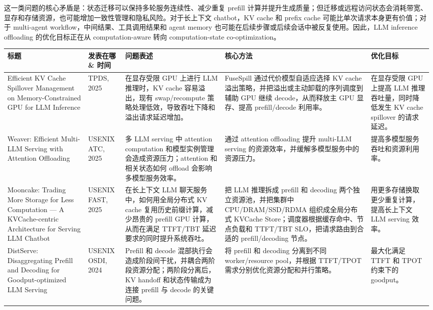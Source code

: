 \documentclass[a4paper,10pt]{ctexart}
\begin{document}
这一类问题的核心矛盾是：状态迁移可以保持多轮服务连续性、减少重复 prefill 计算并提升生成质量；但迁移或远程访问状态会消耗带宽、显存和存储资源，也可能增加一致性管理和隐私风险。对于长上下文 chatbot，KV cache 和 prefix cache 可能比单次请求本身更有价值；对于 multi-agent workflow，中间结果、工具调用结果和 agent memory 也可能在后续步骤或后续会话中被反复使用。因此，LLM inference offloading 的优化目标正在从 computation-aware 转向 computation-state co-optimization。


\begin{table}[H]
\centering
\scriptsize
\setlength{\tabcolsep}{3pt}
\renewcommand{\arraystretch}{1.15}
\begin{tabularx}{\textwidth}{|X|X|X|X|X|}
\hline
\textbf{\textbf{标题}} & \textbf{\textbf{发表在哪 \& 时间}} & \textbf{\textbf{问题表述}} & \textbf{\textbf{核心方法}} & \textbf{\textbf{优化目标}} \\ \hline
Efficient KV Cache Spillover Management on Memory-Constrained GPU for LLM Inference & TPDS, 2025 & 在显存受限 GPU 上进行 LLM 推理时，KV cache 容易溢出，现有 swap/recompute 策略处理低效，导致吞吐下降和溢出请求延迟增加。 & FuseSpill 通过代价模型自适应选择 KV cache 溢出策略，并把溢出或主动卸载的序列调度到辅助 GPU 继续 decode，从而释放主 GPU 显存、提高 prefill/decode 利用率。 & 在显存受限 GPU 上提高 LLM 推理吞吐量，同时降低发生 KV cache spillover 的请求延迟。 \\ \hline
Weaver: Efficient Multi-LLM Serving with Attention Offloading & USENIX ATC, 2025 & 多 LLM serving 中 attention computation 和模型实例管理会造成资源压力；attention 和相关状态如何 offload 会影响多模型服务效率。 & 通过 attention offloading 提升 multi-LLM serving 的资源效率，并缓解多模型服务中的资源压力。 & 提高多模型服务吞吐和资源利用率。 \\ \hline
Mooncake: Trading More Storage for Less Computation — A KVCache-centric Architecture for Serving LLM Chatbot & USENIX FAST, 2025 & 在长上下文 LLM 聊天服务中，如何用全局分布式 KV cache 复用历史前缀计算，减少昂贵的 prefill GPU 计算，从而在满足 TTFT/TBT 延迟要求的同时提升系统吞吐。 & 把 LLM 推理拆成 prefill 和 decoding 两个独立资源池，并把集群中 CPU/DRAM/SSD/RDMA 组织成全局分布式 KVCache Store；调度器根据缓存命中、节点负载和 TTFT/TBT SLO，把请求路由到合适的 prefill/decoding 节点。 & 用更多存储换取更少重复计算，提高长上下文 LLM serving 效率。 \\ \hline
DistServe: Disaggregating Prefill and Decoding for Goodput-optimized LLM Serving & USENIX OSDI, 2024 & Prefill 和 decode 混部执行会造成阶段间干扰，并耦合两阶段资源分配；两阶段分离后，KV handoff 和状态传输成为连接 prefill 与 decode 的关键问题。 & 将 prefill 和 decoding 分离到不同 worker/resource pool，并根据 TTFT/TPOT 需求分别优化资源分配和并行策略。 & 最大化满足 TTFT 和 TPOT 约束下的 goodput。 \\ \hline

\end{tabularx}
\end{table}
\end{document}
